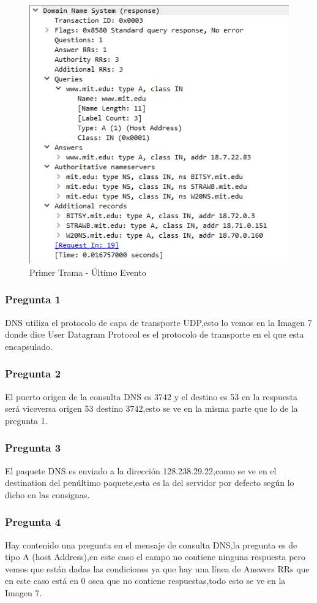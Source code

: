 \documentclass{article}
\begin{document}
\begin{figure}[h]
    \centering
    \includegraphics[width=0.75\linewidth]{Fotos/PrimerTramaSegundoEvento.png}
    \caption{Primer Trama - Último Evento}
\end{figure}

\newpage

\subsubsection{Pregunta 1}
DNS utiliza el protocolo de capa de transporte UDP,esto lo vemos en la Imagen 7 donde dice User Datagram Protocol es el protocolo de transporte en el que esta encapsulado.

\subsubsection{Pregunta 2}
El puerto origen de la consulta DNS es 3742 y el destino es 53 en la respuesta será viceversa origen 53 destino 3742,esto se ve en la misma parte que lo de la pregunta 1.

\subsubsection{Pregunta 3}
El paquete DNS es enviado a la dirección 128.238.29.22,como se ve en el destination del penúltimo paquete,esta es la del servidor por defecto según lo dicho en las consignas.

\subsubsection{Pregunta 4}
Hay contenido una pregunta en el mensaje de consulta DNS,la pregunta es de tipo A (host Address),en este caso el campo no contiene ninguna respuesta pero vemos que están dadas las condiciones ya que hay una línea de Answers RRs que en este caso está en 0 osea que no contiene respuestas,todo esto se ve en la Imagen 7.
\end{document}
